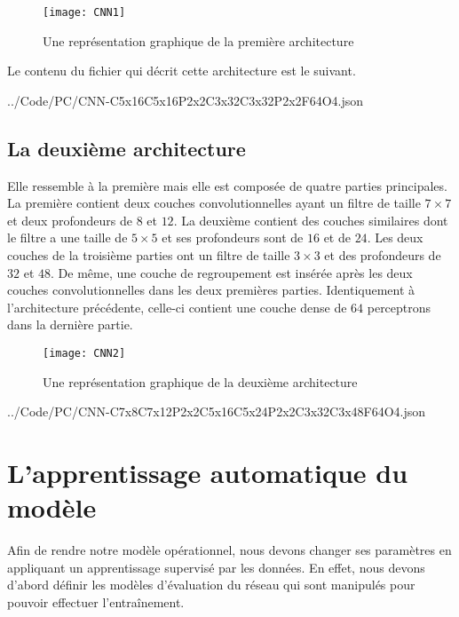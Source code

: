 \begin{figure}[h]
  \centering
  \texttt{[image: CNN1]}
  \caption{Une représentation graphique de la première architecture}
\end{figure}

\vspace{2em}

Le contenu du fichier qui décrit cette architecture est le suivant.

\medskip


{../Code/PC/CNN-C5x16C5x16P2x2C3x32C3x32P2x2F64O4.json}

\subsection{La deuxième architecture}

Elle ressemble à la première mais elle est composée de quatre
parties principales. La première contient deux couches convolutionnelles ayant
un filtre de taille $7 \times 7$ et deux profondeurs de $8$ et $12$.
La deuxième contient des couches similaires dont le filtre a une taille de $5 \times 5$
et ses profondeurs sont de $16$ et de $24$. Les deux couches de la troisième parties ont
un filtre de taille $3 \times 3$ et des profondeurs de $32$ et $48$.
De même, une couche de regroupement est insérée après les deux couches
convolutionnelles dans les deux premières parties. Identiquement à l'architecture
précédente, celle-ci contient une couche dense de $64$ perceptrons dans la
dernière partie.

\begin{figure}[h]
  \centering
  \texttt{[image: CNN2]}
  \caption{Une représentation graphique de la deuxième architecture}
\end{figure}

\vspace{2.5em}


{../Code/PC/CNN-C7x8C7x12P2x2C5x16C5x24P2x2C3x32C3x48F64O4.json}

\section{L'apprentissage automatique du modèle}

Afin de rendre notre modèle opérationnel, nous devons changer ses paramètres en
appliquant un apprentissage supervisé par les données. En effet, nous devons
d'abord définir les modèles d'évaluation du réseau qui sont manipulés pour pouvoir
effectuer l’entraînement.

